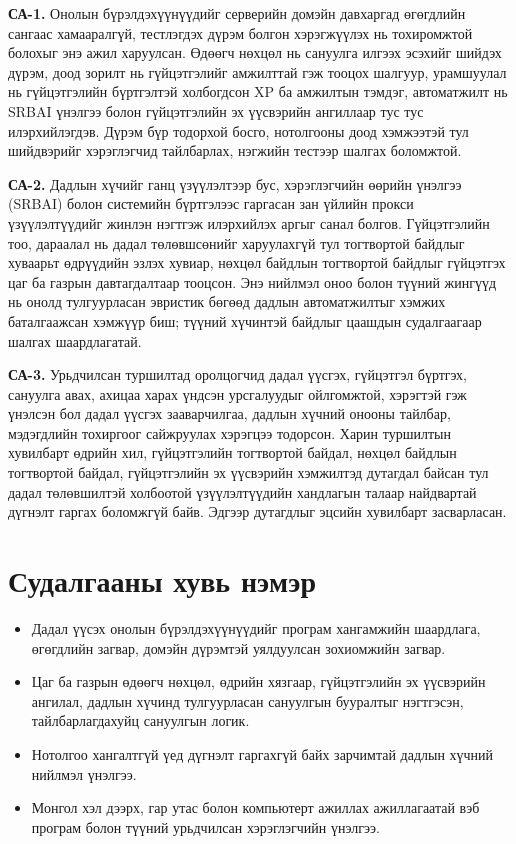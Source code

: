 \textbf{СА-1.} Онолын бүрэлдэхүүнүүдийг серверийн домэйн давхаргад өгөгдлийн сангаас хамааралгүй, тестлэгдэх дүрэм болгон хэрэгжүүлэх нь тохиромжтой болохыг энэ ажил харуулсан. Өдөөгч нөхцөл нь сануулга илгээх эсэхийг шийдэх дүрэм, доод зорилт нь гүйцэтгэлийг амжилттай гэж тооцох шалгуур, урамшуулал нь гүйцэтгэлийн бүртгэлтэй холбогдсон XP ба амжилтын тэмдэг, автоматжилт нь SRBAI үнэлгээ болон гүйцэтгэлийн эх үүсвэрийн ангиллаар тус тус илэрхийлэгдэв. Дүрэм бүр тодорхой босго, нотолгооны доод хэмжээтэй тул шийдвэрийг хэрэглэгчид тайлбарлах, нэгжийн тестээр шалгах боломжтой.

\textbf{СА-2.} Дадлын хүчийг ганц үзүүлэлтээр бус, хэрэглэгчийн өөрийн үнэлгээ (SRBAI) болон системийн бүртгэлээс гаргасан зан үйлийн прокси үзүүлэлтүүдийг жинлэн нэгтгэж илэрхийлэх аргыг санал болгов. Гүйцэтгэлийн тоо, дараалал нь дадал төлөвшсөнийг харуулахгүй тул тогтвортой байдлыг хуваарьт өдрүүдийн эзлэх хувиар, нөхцөл байдлын тогтвортой байдлыг гүйцэтгэх цаг ба газрын давтагдалтаар тооцсон. Энэ нийлмэл оноо болон түүний жингүүд нь онолд тулгуурласан эвристик бөгөөд дадлын автоматжилтыг хэмжих баталгаажсан хэмжүүр биш; түүний хүчинтэй байдлыг цаашдын судалгаагаар шалгах шаардлагатай.

\textbf{СА-3.} Урьдчилсан туршилтад оролцогчид дадал үүсгэх, гүйцэтгэл бүртгэх, сануулга авах, ахицаа харах үндсэн урсгалуудыг ойлгомжтой, хэрэгтэй гэж үнэлсэн бол дадал үүсгэх зааварчилгаа, дадлын хүчний онооны тайлбар, мэдэгдлийн тохиргоог сайжруулах хэрэгцээ тодорсон. Харин туршилтын хувилбарт өдрийн хил, гүйцэтгэлийн тогтвортой байдал, нөхцөл байдлын тогтвортой байдал, гүйцэтгэлийн эх үүсвэрийн хэмжилтэд дутагдал байсан тул дадал төлөвшилтэй холбоотой үзүүлэлтүүдийн хандлагын талаар найдвартай дүгнэлт гаргах боломжгүй байв. Эдгээр дутагдлыг эцсийн хувилбарт засварласан.

\section*{Судалгааны хувь нэмэр}

\begin{itemize}
    \item Дадал үүсэх онолын бүрэлдэхүүнүүдийг програм хангамжийн шаардлага, өгөгдлийн загвар, домэйн дүрэмтэй уялдуулсан зохиомжийн загвар.
    \item Цаг ба газрын өдөөгч нөхцөл, өдрийн хязгаар, гүйцэтгэлийн эх үүсвэрийн ангилал, дадлын хүчинд тулгуурласан сануулгын бууралтыг нэгтгэсэн, тайлбарлагдахуйц сануулгын логик.
    \item Нотолгоо хангалтгүй үед дүгнэлт гаргахгүй байх зарчимтай дадлын хүчний нийлмэл үнэлгээ.
    \item Монгол хэл дээрх, гар утас болон компьютерт ажиллах ажиллагаатай вэб програм болон түүний урьдчилсан хэрэглэгчийн үнэлгээ.
\end{itemize}

